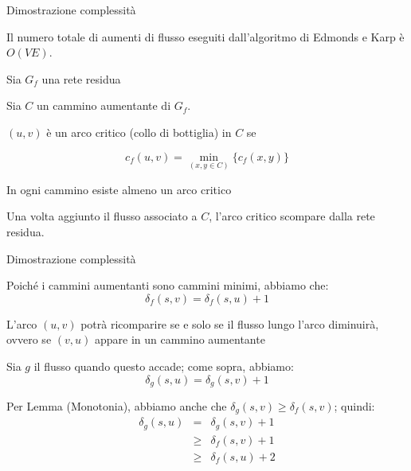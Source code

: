 \begin{frame}{Dimostrazione complessità}

\vspace{-9pt}
\begin{myboxtitle}
Il numero totale di aumenti di flusso eseguiti dall'algoritmo
di Edmonds e Karp è $O(VE)$.
\end{myboxtitle}

\BIL
\item Sia $G_f$ una rete residua
\item Sia $C$ un cammino aumentante di $G_f$. 
\item $(u,v)$ è un arco \alert{critico} (collo di bottiglia) in $C$ se 

\[
c_f(u,v) = \min_{(x,y \in C)} \{ c_f(x,y) \}
\]

\item In ogni cammino esiste almeno un arco critico
\item Una volta aggiunto il flusso associato a $C$, l'arco critico scompare dalla rete residua. 
\EIL

\end{frame}

\begin{frame}{Dimostrazione complessità}

\BIL
\item Poiché i cammini aumentanti sono cammini minimi, abbiamo che:
\[
 \delta_f(s,v) = \delta_f(s,u)+1
\]
\item L'arco $(u,v)$ potrà ricomparire se e solo se il flusso lungo l'arco 
diminuirà, ovvero se $(v,u)$ appare in un cammino aumentante
\item  Sia $g$ il flusso quando questo accade; come sopra, abbiamo:
\[
 \delta_{g}(s,u) = \delta_{g}(s,v)+1
\]
\item Per Lemma (Monotonia), abbiamo anche che $\delta_g(s,v)
\geq \delta_{f}(s,v)$; quindi:
\begin{eqnarray*}
\delta_{g}(s,u) &=& \delta_{g}(s,v)+1 \\
  & \geq & \delta_f(s,v) + 1 \\
  & \geq & \delta_f(s,u) + 2
\end{eqnarray*}
\EIL

\end{frame}

